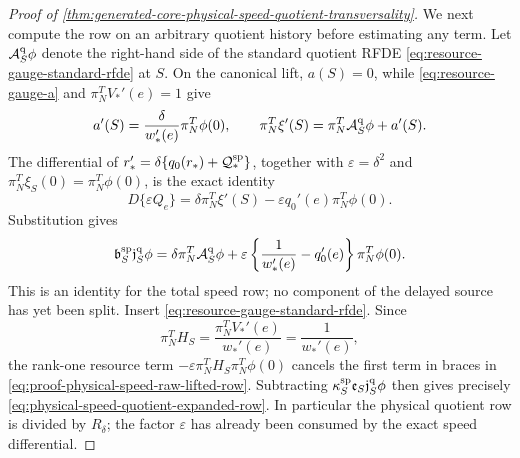 \begin{proof}[Proof of
\cref{thm:generated-core-physical-speed-quotient-transversality}]
We next compute the row on an arbitrary quotient history before estimating
any term.  Let \(\mathcal A_S^{\rm q}\phi\) denote the right-hand side of
the standard quotient RFDE
\cref{eq:resource-gauge-standard-rfde} at \(S\).  On the canonical lift,
\(a(S)=0\), while \cref{eq:resource-gauge-a} and
\(\pi_N^TV_*'(e)=1\) give
\begin{equation}
 a'(S)=\frac{\delta}{w_*'(e)}\pi_N^T\phi(0),
 \qquad
 \pi_N^T\xi'(S)
 =\pi_N^T\mathcal A_S^{\rm q}\phi+a'(S).        \label{eq:proof-physical-speed-lifted-current-derivative}
\end{equation}
The differential of
\(r_*'=\delta\{q_0(r_*)+\mathcal Q_*^{\rm sp}\}\), together with
\(\varepsilon=\delta^2\) and
\(\pi_N^T\xi_S(0)=\pi_N^T\phi(0)\), is the exact identity
\[
 D\{\varepsilon Q_e\}
 =\delta\pi_N^T\xi'(S)
   -\varepsilon q_0'(e)\pi_N^T\phi(0).
\]
Substitution gives
\begin{equation}
 \mathfrak b_S^{\rm sp}\mathfrak j_S^{\rm q}\phi
 =\delta\pi_N^T\mathcal A_S^{\rm q}\phi
  +\varepsilon\left\{\frac1{w_*'(e)}-q_0'(e)\right\}
       \pi_N^T\phi(0).                          \label{eq:proof-physical-speed-raw-lifted-row}
\end{equation}
This is an identity for the total speed row; no component of the delayed
source has yet been split.  Insert
\cref{eq:resource-gauge-standard-rfde}.  Since
\[
 \pi_N^TH_S=\frac{\pi_N^TV_*'(e)}{w_*'(e)}
             =\frac1{w_*'(e)},
\]
the rank-one resource term
\(-\varepsilon\pi_N^TH_S\pi_N^T\phi(0)\) cancels the
first term in braces in
\cref{eq:proof-physical-speed-raw-lifted-row}.  Subtracting
\(\kappa_S^{\rm sp}\mathfrak e_S\mathfrak j_S^{\rm q}\phi\) then gives precisely
\cref{eq:physical-speed-quotient-expanded-row}.  In particular the
physical quotient row is divided by \(R_\delta\); the factor
\(\varepsilon\) has already been consumed by the exact speed differential.


\end{proof}
